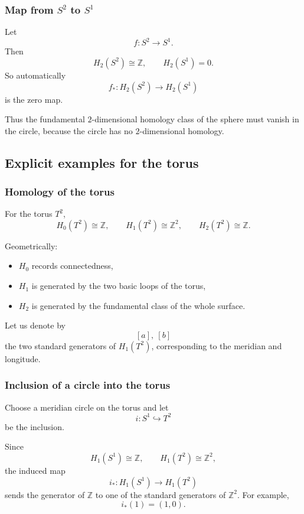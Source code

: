 \documentclass[12pt,a4paper]{article}
\theoremstyle{notespace}
\begin{document}
\subsubsection{Map from \texorpdfstring{$S^2$}{S2} to \texorpdfstring{$S^1$}{S1}}

Let
\[
f:S^2\to S^1.
\]
Then
\[
H_2(S^2)\cong \mathbb{Z},
\qquad
H_2(S^1)=0.
\]
So automatically
\[
f_*:H_2(S^2)\to H_2(S^1)
\]
is the zero map.

Thus the fundamental \(2\)-dimensional homology class of the sphere must vanish in the circle, because the circle has no \(2\)-dimensional homology.

\subsection{Explicit examples for the torus}

\subsubsection{Homology of the torus}

For the torus \(T^2\),
\[
H_0(T^2)\cong \mathbb{Z},\qquad
H_1(T^2)\cong \mathbb{Z}^2,\qquad
H_2(T^2)\cong \mathbb{Z}.
\]

Geometrically:
\begin{itemize}
	\item \(H_0\) records connectedness,
	\item \(H_1\) is generated by the two basic loops of the torus,
	\item \(H_2\) is generated by the fundamental class of the whole surface.
\end{itemize}

Let us denote by
\[
[a],\ [b]
\]
the two standard generators of \(H_1(T^2)\), corresponding to the meridian and longitude.

\subsubsection{Inclusion of a circle into the torus}

Choose a meridian circle on the torus and let
\[
i:S^1\hookrightarrow T^2
\]
be the inclusion.

Since
\[
H_1(S^1)\cong \mathbb{Z},
\qquad
H_1(T^2)\cong \mathbb{Z}^2,
\]
the induced map
\[
i_*:H_1(S^1)\to H_1(T^2)
\]
sends the generator of \(\mathbb{Z}\) to one of the standard generators of \(\mathbb{Z}^2\). For example,
\[
i_*(1)=(1,0).
\]
\end{document}

